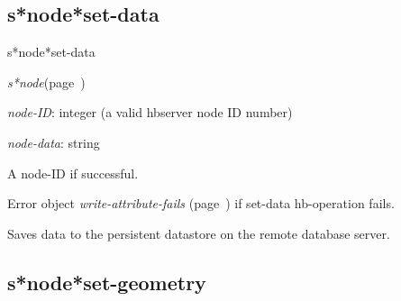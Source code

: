 \subsection{s*node*set-data}
\label{s*node*set-data}

\begin{description}
\item [Name:]  s*node*set-data

\item [Class:] {\sl s*node}\hfill(page~\pageref{s*node})

\item [Parameters:]
\item {\sl node-ID}:  
integer (a valid hbserver node ID number)

\item {\sl node-data}:  string


\item [Return-value:]
A node-ID if successful.

Error object {\sl write-attribute-fails} (page~\pageref{write-attribute-fails}) if set-data
hb-operation fails.

\item [Description:]
Saves data to the persistent datastore on the remote
database server.


\item [Public:]



\end{description}
\horizontalline

\subsection{s*node*set-geometry}
\label{s*node*set-geometry}

